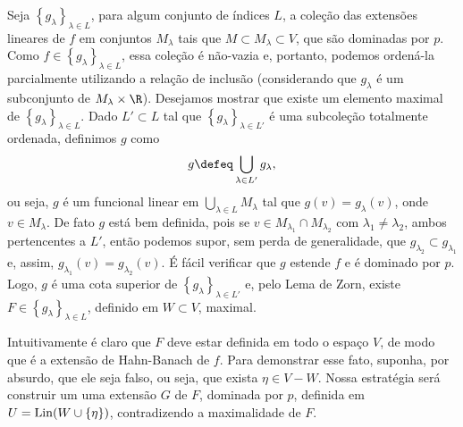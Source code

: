 Seja \( \left\{ g_{ \lambda } \right\}_{ \lambda \in L } \), para algum conjunto de índices \( L \), a coleção das extensões lineares de \( f \) em conjuntos \( M_{ \lambda } \) tais que \( M \subset  M_{ \lambda } \subset V \), que são dominadas por \( p \).
Como \( f \in \left\{ g_{ \lambda } \right\}_{ \lambda \in L } \), essa coleção é não-vazia e, portanto, podemos ordená-la parcialmente utilizando a relação de inclusão (considerando que \( g_{ \lambda } \) é um subconjunto de \( M_{ \lambda } \times \R \)).
Desejamos mostrar que existe um elemento maximal de \( \left\{ g_{ \lambda } \right\}_{ \lambda \in L } \).
Dado \( L' \subset L \) tal que \( \left\{ g_{ \lambda } \right\}_{ \lambda \in L' } \) é uma subcoleção totalmente ordenada, definimos \( g \) como \[
    g \defeq \bigcup_{ \lambda \in L' } g_{ \lambda }
,\]
ou seja, \( g \) é um funcional linear em \( \bigcup_{ \lambda \in L } M_{ \lambda } \) tal que \( g(v) = g_{ \lambda } (v) \), onde \( v \in M_{ \lambda } \).
De fato \( g \) está bem definida, pois se \( v \in M_{ \lambda_{ 1 } } \cap M_{ \lambda_{ 2 } } \) com \( \lambda_{ 1 } \neq \lambda_{ 2 } \), ambos pertencentes a \( L' \), então podemos supor, sem perda de generalidade, que \( g_{ \lambda_{ 2 } } \subset g_{ \lambda_{ 1 } } \) e, assim, \( g_{ \lambda_{ 1 } } (v) = g_{ \lambda_{ 2 } }(v) \). 
É fácil verificar que \( g \) estende \( f \) e é dominado por \( p \).
Logo, \( g \) é uma cota superior de \( \left\{ g_{ \lambda } \right\}_{ \lambda \in L' } \) e, pelo Lema de Zorn, existe \( F \in \left\{ g_{ \lambda } \right\}_{ \lambda \in L } \), definido em \( W \subset  V \), maximal.

Intuitivamente é claro que \( F \) deve estar definida em todo o espaço \( V \), de modo que é a extensão de Hahn-Banach de \( f \).
Para demonstrar esse fato, suponha, por absurdo, que ele seja falso, ou seja, que exista \( \eta \in V - W \).
Nossa estratégia será construir um uma extensão \( G \) de \( F \), dominada por \( p \), definida em \( U = \operatorname{Lin} (W \cup \left\{ \eta \right\}) \), contradizendo a maximalidade de \( F \).

